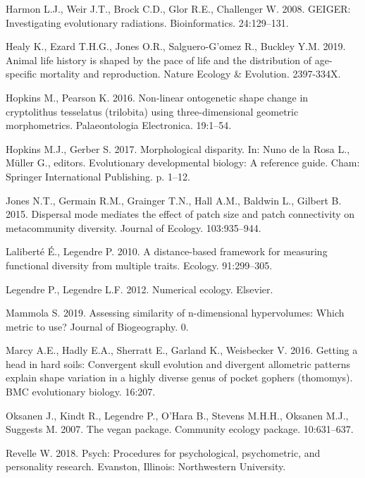 \documentclass[]{article}
\begin{document}
\hypertarget{ref-geiger2008}{}
Harmon L.J., Weir J.T., Brock C.D., Glor R.E., Challenger W. 2008.
GEIGER: Investigating evolutionary radiations. Bioinformatics.
24:129--131.

\hypertarget{ref-healy2019}{}
Healy K., Ezard T.H.G., Jones O.R., Salguero-G'omez R., Buckley Y.M.
2019. Animal life history is shaped by the pace of life and the
distribution of age-specific mortality and reproduction. Nature Ecology
\& Evolution. 2397-334X.

\hypertarget{ref-hopkins2016}{}
Hopkins M., Pearson K. 2016. Non-linear ontogenetic shape change in
cryptolithus tesselatus (trilobita) using three-dimensional geometric
morphometrics. Palaeontologia Electronica. 19:1--54.

\hypertarget{ref-hopkins2017}{}
Hopkins M.J., Gerber S. 2017. Morphological disparity. In: Nuno de la
Rosa L., Müller G., editors. Evolutionary developmental biology: A
reference guide. Cham: Springer International Publishing. p. 1--12.

\hypertarget{ref-jones2015}{}
Jones N.T., Germain R.M., Grainger T.N., Hall A.M., Baldwin L., Gilbert
B. 2015. Dispersal mode mediates the effect of patch size and patch
connectivity on metacommunity diversity. Journal of Ecology.
103:935--944.

\hypertarget{ref-lalibertuxe92010}{}
Laliberté É., Legendre P. 2010. A distance-based framework for measuring
functional diversity from multiple traits. Ecology. 91:299--305.

\hypertarget{ref-legendre2012}{}
Legendre P., Legendre L.F. 2012. Numerical ecology. Elsevier.

\hypertarget{ref-mammola2019}{}
Mammola S. 2019. Assessing similarity of n-dimensional hypervolumes:
Which metric to use? Journal of Biogeography. 0.

\hypertarget{ref-marcy2016}{}
Marcy A.E., Hadly E.A., Sherratt E., Garland K., Weisbecker V. 2016.
Getting a head in hard soils: Convergent skull evolution and divergent
allometric patterns explain shape variation in a highly diverse genus of
pocket gophers (thomomys). BMC evolutionary biology. 16:207.

\hypertarget{ref-oksanen2007vegan}{}
Oksanen J., Kindt R., Legendre P., O'Hara B., Stevens M.H.H., Oksanen
M.J., Suggests M. 2007. The vegan package. Community ecology package.
10:631--637.

\hypertarget{ref-psych}{}
Revelle W. 2018. Psych: Procedures for psychological, psychometric, and
personality research. Evanston, Illinois: Northwestern University.
\end{document}
